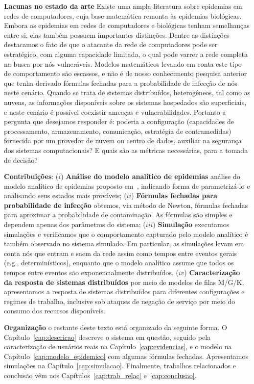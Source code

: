 	\textbf{Lacunas no estado da arte} Existe uma ampla literatura sobre epidemias em redes de computadores, cuja base matemática remonta às epidemias biológicas.  Embora as epidemias em redes de computadores e biológicas tenham semelhanças entre si, elas também possuem importantes distinções. Dentre as distinções  destacamos o fato de que o atacante da rede de computadores pode ser estratégico, com alguma capacidade limitada, o qual pode varrer a rede completa na busca por nós vulneráveis. Modelos matemáticos levando em conta este tipo de comportamento são escassos, e não é de nosso conhecimento  pesquisa anterior que tenha derivado fórmulas fechadas para a probabilidade de infecção de nós neste cenário. Quando se trata de sistemas distribuídos, heterogêneos, tal como as nuvens, as informações disponíveis sobre os sistemas hospedados são superficiais, e neste cenário é possível coexistir ameaças e vulnerabilidades. Portanto a pergunta que desejamos responder é: poderia a configuração  (capacidades de processamento, armazenamento, comunicação, estratégia de contramedidas) fornecida por um provedor de nuvem ou centro de dados, auxiliar na segurança dos sistemas computacionais? E quais são as métricas necessárias, para a tomada de decisão?
	
	

	\textbf{Contribuições}:
	($i$) \textbf{Análise do modelo analítico de epidemias}  análise do  modelo analítico de epidemias proposto em~\cite{rufino2018contaminaccao}, indicando forma de parametrizá-lo e  analisando seus estados mais prováveis; 
	($ii$) \textbf{Fórmulas fechadas para probabilidade de infecção} obtemos,  via método de Newton, fórmulas fechadas para aproximar a  probabilidade de contaminação. As fórmulas são simples e dependem apenas dos parâmetros do sistema; 
	($iii)$ \textbf{Simulação} executamos simulações e verificamos que o comportamento capturado pelo modelo analítico é também observado no  sistema  simulado. Em particular, as simulações levam em conta nós que entram e saem da rede assim como tempos entre eventos gerais (e.g., determinísticos), enquanto que o modelo analítico assume que todos os tempos entre eventos são exponencialmente distribuídos.
	($iv$) \textbf{Caracterização da resposta de sistemas distribuídos} por meio de modelos de filas M/G/K, apresentamos a resposta de sistemas distribuídos para diferentes configurações e regimes de trabalho, inclusive sob ataques de negação de serviço por meio do consumo dos recursos disponíveis.


	\textbf{Organização}
	o restante deste texto está organizado da seguinte forma. O Capítulo~\ref{cap:descricao} descreve o sistema em questão, seguido pela caracterização de usuários reais na Capítulo~\ref{cap:evidencias}, e o modelo na Capítulo~\ref{cap:modelo_epidemico} com algumas fórmulas fechadas. Apresentamos simulações na Capítulo~\ref{cap:simulacao}.   Finalmente, trabalhos relacionados e conclusão vêm nos Capítulos~\ref{cap:trab_relac} e~\ref{cap:conclusao}.